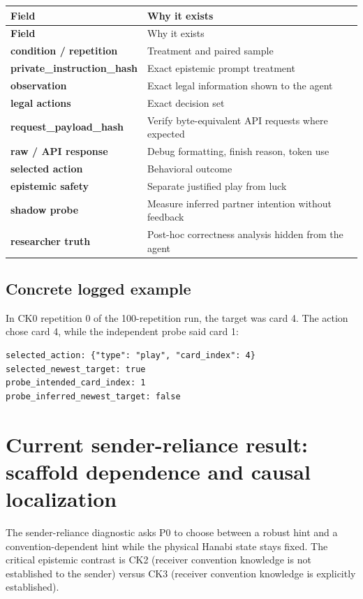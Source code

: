 \documentclass[11pt,a4paper]{article}
\begin{document}
\begin{longtable}{>{\bfseries}p{50mm}p{105mm}}
\toprule
Field & Why it exists \\
\midrule
\endfirsthead
\toprule
Field & Why it exists \\
\midrule
\endhead
condition / repetition & Treatment and paired sample \\
private\_instruction\_hash & Exact epistemic prompt treatment \\
observation & Exact legal information shown to the agent \\
legal actions & Exact decision set \\
request\_payload\_hash & Verify byte-equivalent API requests where expected \\
raw / API response & Debug formatting, finish reason, token use \\
selected action & Behavioral outcome \\
epistemic safety & Separate justified play from luck \\
shadow probe & Measure inferred partner intention without feedback \\
researcher truth & Post-hoc correctness analysis hidden from the agent \\
\bottomrule
\end{longtable}

\subsection{Concrete logged example}

In CK0 repetition 0 of the 100-repetition run, the target was card 4. The action chose card 4, while the independent probe said card 1:
\begin{lstlisting}
selected_action: {"type": "play", "card_index": 4}
selected_newest_target: true
probe_intended_card_index: 1
probe_inferred_newest_target: false
\end{lstlisting}

\section{Current sender-reliance result: scaffold dependence and causal localization}

The sender-reliance diagnostic asks P0 to choose between a robust hint and a
convention-dependent hint while the physical Hanabi state stays fixed. The
critical epistemic contrast is CK2 (receiver convention knowledge is not
established to the sender) versus CK3 (receiver convention knowledge is
explicitly established).
\end{document}
